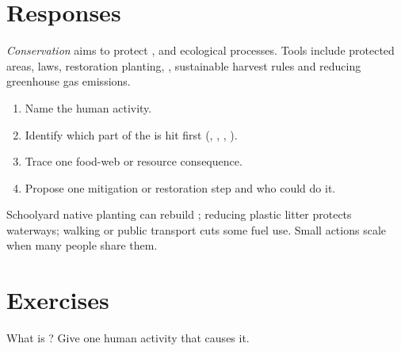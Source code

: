 \section{Responses}

\begin{definition}[Conservation]\label{def:g7:impact:conserve}
\emph{Conservation} aims to protect ,
 and ecological processes. Tools include protected areas, laws,
restoration planting,  , sustainable harvest rules and
reducing greenhouse gas emissions.
\end{definition}

\begin{method}\label{met:g7:impact:think}
\begin{enumerate}
  \item Name the human activity.
  \item Identify which part of the  is hit first (,
        , , ).
  \item Trace one food-web or resource consequence.
  \item Propose one mitigation or restoration step and who could do it.
\end{enumerate}
\end{method}

\begin{example}\label{ex:g7:impact:local}
Schoolyard native planting can rebuild  ; reducing plastic
litter protects waterways; walking or public transport cuts some 
fuel use. Small actions scale when many people share them.
\end{example}

\section{Exercises}

\begin{exercise}[$\star$]\label{exo:g7:impact:1}
What is ? Give one human activity that causes it.
\end{exercise}

